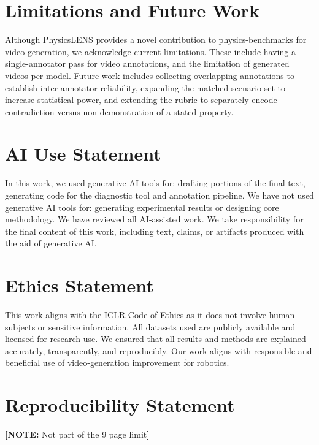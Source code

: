 \documentclass{article} %
\newcommand{\authornote}[1]{\textcolor{AuthorNote}{\textbf{[NOTE:} #1\textbf{]}}}
\begin{document}
\section{Limitations and Future Work}

Although PhysicsLENS provides a novel contribution to physics-benchmarks for video generation, we acknowledge current limitations. These include having a single-annotator pass for video annotations, and the limitation of generated videos per model. Future work includes collecting overlapping annotations to establish inter-annotator reliability, expanding the matched scenario set to increase statistical power, and extending the rubric to separately encode contradiction versus non-demonstration of a stated property.

\section{AI Use Statement}
In this work, we used generative AI tools for: drafting portions of the final text, generating code for the diagnostic tool and annotation pipeline. We have not used generative AI tools for: generating experimental results or designing core methodology.
We have reviewed all AI-assisted work. We take responsibility for the final content of this work, including text, claims, or artifacts produced with the aid of generative AI.

\section{Ethics Statement}
This work aligns with the ICLR Code of Ethics as it does not involve human subjects or sensitive information. All datasets used are publicly available and licensed for research use. We ensured that all results and methods are explained accurately, transparently, and reproducibly. Our work aligns with responsible and beneficial use of video-generation improvement for robotics.

\section{Reproducibility Statement}
\authornote{Not part of the 9 page limit}




\clearpage
\appendix

\end{document}
